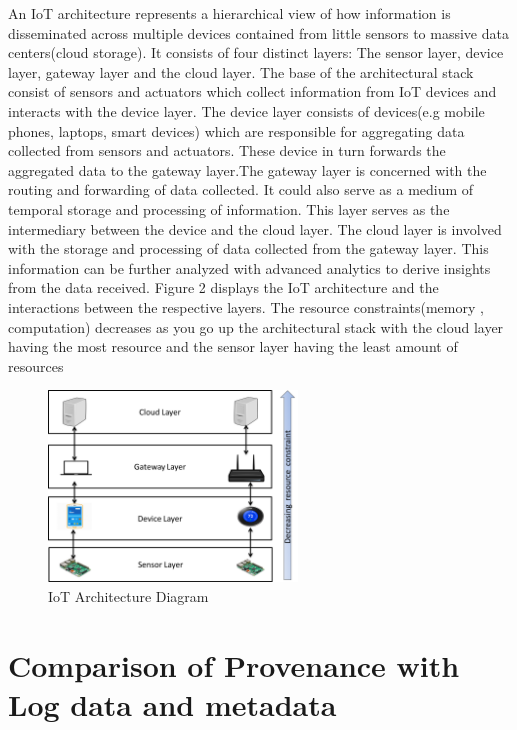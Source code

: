 An IoT architecture represents a hierarchical view of how information is disseminated across multiple devices contained from little sensors to massive data centers(cloud storage). It consists of four distinct layers: The sensor layer, device layer, gateway layer and the cloud layer. The base of the architectural stack consist of sensors and actuators which collect information from IoT devices and interacts with the device layer. The device layer consists of devices(e.g mobile phones, laptops, smart devices) which are responsible for aggregating data collected from sensors and actuators. These device in turn forwards the aggregated data to the gateway layer.The gateway layer is concerned with the routing and forwarding of data collected. It could also serve as a medium of temporal storage and processing of information. This layer serves as the intermediary between the device and the cloud layer. The cloud layer is involved with the storage and processing of data collected from the gateway layer. This information can be further analyzed with advanced analytics to derive insights from the data received.  Figure 2 displays the IoT architecture and the interactions between the respective  layers. The resource constraints(memory , computation) decreases as you go up the architectural stack with the cloud layer having the most resource and the sensor layer having the least amount of resources


\begin{figure}[h]
\begin{center}

\includegraphics[height=2.0in]{iot_architecture.png}
\end{center}
\caption{IoT Architecture Diagram}

\end{figure}



\section{Comparison of Provenance with Log data and metadata}

